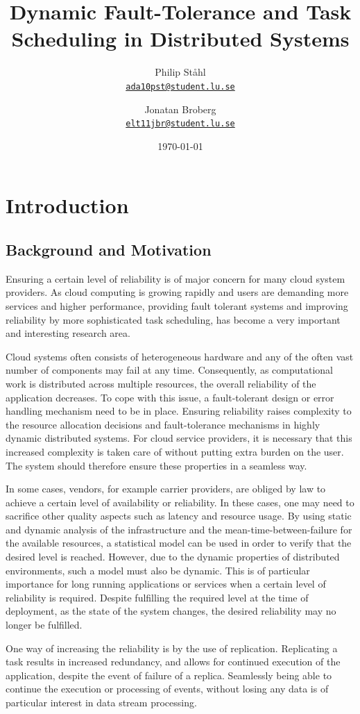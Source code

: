 \documentclass{cslthse-msc}
\author{
	Philip Ståhl \\
	{\normalsize \href{mailto:ada10pst@student.lu.se}{\texttt{ada10pst@student.lu.se}}}
	\and
	Jonatan Broberg \\
    {\normalsize \href{mailto:elt11jbr@student.lu.se
}{\texttt{elt11jbr@student.lu.se}}}
}
\title{Dynamic Fault-Tolerance and Task Scheduling in Distributed Systems}
\subtitle{}
\date{\today}
\begin{document}
\makefrontmatter

\chapter{Introduction} \label{ch:introduction} 
\section{Background and Motivation} \label{sec:introduction_backgroud_motivation}
Ensuring a certain level of reliability is of major concern for many cloud system providers. As cloud computing is growing rapidly and users are demanding more services and higher performance, providing fault tolerant systems and improving reliability by more sophisticated task scheduling, has become a very important and interesting research area. 

Cloud systems often consists of heterogeneous hardware and any of the often vast number of components may fail at any time. Consequently, as computational work is distributed across multiple resources, the overall reliability of the application decreases. To cope with this issue, a fault-tolerant design or error handling mechanism need to be in place. Ensuring reliability raises complexity to the resource allocation decisions and fault-tolerance mechanisms in highly dynamic distributed systems. For cloud service providers, it is necessary that this increased complexity is taken care of without putting extra burden on the user. The system should therefore ensure these properties in a seamless way.

In some cases, vendors, for example carrier providers, are obliged by law to achieve a certain level of availability or reliability. In these cases, one may need to sacrifice other quality aspects such as latency and resource usage. By using static and dynamic analysis of the infrastructure and the mean-time-between-failure for the available resources, a statistical model can be used in order to verify that the desired level is reached. However, due to the dynamic properties of distributed environments, such a model must also be dynamic. This is of particular importance for long running applications or services when a certain level of reliability is required. Despite fulfilling the required level at the time of deployment, as the state of the system changes, the desired reliability may no longer be fulfilled.

One way of increasing the reliability is by the use of replication. Replicating a task results in increased redundancy, and allows for continued execution of the application, despite the event of failure of a replica. Seamlessly being able to continue the execution or processing of events, without losing any data is of particular interest in data stream processing.
\end{document}
